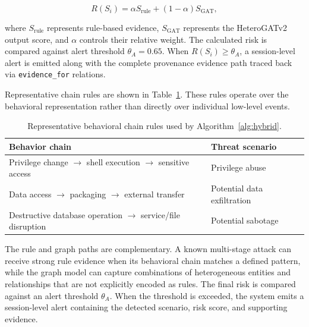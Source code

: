 \documentclass[conference]{IEEEtran}
\begin{document}
\begin{equation}
R(S_i)
=
\alpha S_{\mathrm{rule}}
+
(1-\alpha)S_{\mathrm{GAT}},
\label{eq:risk}
\end{equation}

where $S_{\mathrm{rule}}$ represents rule-based evidence, $S_{\mathrm{GAT}}$ represents the HeteroGATv2 output score, and $\alpha$ controls their relative weight. The calculated risk is compared against alert threshold $\theta_A = 0.65$. When $R(S_i) \ge \theta_A$, a session-level alert is emitted along with the complete provenance evidence path traced back via \texttt{evidence\_for} relations.


Representative chain rules are shown in Table~\ref{tab:rules}. These rules operate over the behavioral representation rather than directly over individual low-level events.

\begin{table}[t]
\centering
\caption{Representative behavioral chain rules used by Algorithm~\ref{alg:hybrid}.}
\label{tab:rules}
\small
\begin{tabular}{@{}p{4.2cm}p{3.1cm}@{}}
\toprule
\textbf{Behavior chain} & \textbf{Threat scenario} \\
\midrule
Privilege change $\rightarrow$ shell execution
$\rightarrow$ sensitive access &
Privilege abuse \\

Data access $\rightarrow$ packaging
$\rightarrow$ external transfer &
Potential data exfiltration \\

Destructive database operation
$\rightarrow$ service/file disruption &
Potential sabotage \\
\bottomrule
\end{tabular}
\end{table}

The rule and graph paths are complementary. A known multi-stage attack can receive strong rule evidence when its behavioral chain matches a defined pattern, while the graph model can capture combinations of heterogeneous entities and relationships that are not explicitly encoded as rules. The final risk is compared against an alert threshold $\theta_A$. When the threshold is exceeded, the system emits a session-level alert containing the detected scenario, risk score, and supporting evidence.
\end{document}
